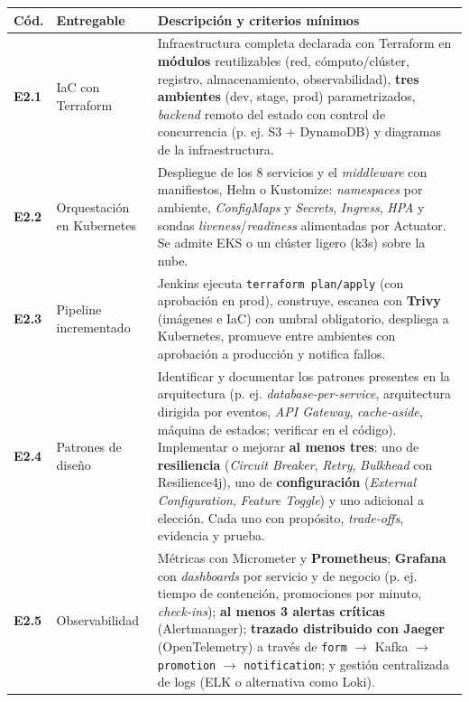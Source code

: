 \documentclass[10pt,letterpaper]{article}
\begin{document}
\vspace{0.04cm}
\noindent\small
\begin{tabularx}{\textwidth}{|L{1.0cm}|L{3.3cm}|X|}
\hline
{}
\textbf{Cód.} & \textbf{Entregable} & \textbf{Descripción y criterios mínimos} \\ \hline
\textbf{E2.1} & IaC con Terraform & Infraestructura completa declarada con Terraform en \textbf{módulos} reutilizables (red, cómputo/clúster, registro, almacenamiento, observabilidad), \textbf{tres ambientes} (dev, stage, prod) parametrizados, \textit{backend} remoto del estado con control de concurrencia (p. ej. S3 + DynamoDB) y diagramas de la infraestructura. \\ \hline
\textbf{E2.2} & Orquestación en Kubernetes & Despliegue de los 8 servicios y el \textit{middleware} con manifiestos, Helm o Kustomize: \textit{namespaces} por ambiente, \textit{ConfigMaps} y \textit{Secrets}, \textit{Ingress}, \textit{HPA} y sondas \textit{liveness}/\textit{readiness} alimentadas por Actuator. Se admite EKS o un clúster ligero (k3s) sobre la nube. \\ \hline
\textbf{E2.3} & Pipeline incrementado & Jenkins ejecuta \texttt{terraform plan/apply} (con aprobación en prod), construye, escanea con \textbf{Trivy} (imágenes e IaC) con umbral obligatorio, despliega a Kubernetes, promueve entre ambientes con aprobación a producción y notifica fallos. \\ \hline
\textbf{E2.4} & Patrones de diseño & Identificar y documentar los patrones presentes en la arquitectura (p. ej. \textit{database-per-service}, arquitectura dirigida por eventos, \textit{API Gateway}, \textit{cache-aside}, máquina de estados; verificar en el código). Implementar o mejorar \textbf{al menos tres}: uno de \textbf{resiliencia} (\textit{Circuit Breaker}, \textit{Retry}, \textit{Bulkhead} con Resilience4j), uno de \textbf{configuración} (\textit{External Configuration}, \textit{Feature Toggle}) y uno adicional a elección. Cada uno con propósito, \textit{trade-offs}, evidencia y prueba. \\ \hline
\textbf{E2.5} & Observabilidad & Métricas con Micrometer y \textbf{Prometheus}; \textbf{Grafana} con \textit{dashboards} por servicio y de negocio (p. ej. tiempo de contención, promociones por minuto, \textit{check-ins}); \textbf{al menos 3 alertas críticas} (Alertmanager); \textbf{trazado distribuido con Jaeger} (OpenTelemetry) a través de \texttt{form} $\rightarrow$ Kafka $\rightarrow$ \texttt{promotion} $\rightarrow$ \texttt{notification}; y gestión centralizada de logs (ELK o alternativa como Loki). \\ \hline

\end{tabularx}
\end{document}
